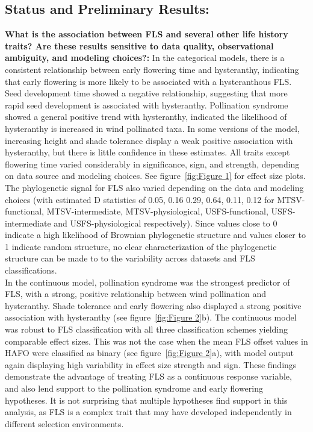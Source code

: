\documentclass[12pt]{article}\usepackage[]{graphicx}\usepackage[]{color}
\begin{document}
\subsection*{Status and Preliminary Results:}
\indent\indent\textbf{What is the association between FLS and several other life history traits?  Are these results sensitive to data quality, observational ambiguity, and modeling choices?:} In the categorical models, there is a consistent relationship between early flowering time and hysteranthy, indicating that early flowering is more likely to be associated with a hysteranthous FLS. Seed development time showed a negative relationship, suggesting that more rapid seed development is associated with hysteranthy. Pollination syndrome showed a general positive trend with hysteranthy, indicated the likelihood of hysteranthy is increased in wind pollinated taxa. In some versions of the model, increasing height and shade tolerance display a weak positive association with hysteranthy, but there is little confidence in these estimates. All traits except flowering time varied considerably in significance, sign, and strength, depending on data source and modeling choices. See figure~\ref{fig:Figure 1} for effect size plots.\\
\indent The phylogenetic signal for FLS also varied depending on the data and modeling choices (with estimated D statistics of 0.05, 0.16 0.29, 0.64, 0.11, 0.12 for MTSV-functional, MTSV-intermediate, MTSV-physiological, USFS-functional, USFS-intermediate and USFS-physiological respectively). Since values close to 0 indicate a high likelihood of Brownian phylogenetic structure and values closer to 1 indicate random structure, no clear characterization of the phylogenetic structure can be made to to the variability across datasets and FLS classifications. \\
\indent In the continuous model, pollination syndrome was the strongest predictor of FLS, with a strong, positive relationship between wind pollination and hysteranthy. Shade tolerance and early flowering also displayed a strong positive association with hysteranthy (see figure~\ref{fig:Figure 2}b). The continuous model was robust to FLS classification with all three classification schemes yielding comparable effect sizes. This was not the case when the mean FLS offset values in HAFO were classified as binary (see figure~\ref{fig:Figure 2}a), with model output again displaying high variability in effect size strength and sign. These findings demonstrate the advantage of treating FLS as a continuous response variable, and also lend support to the pollination syndrome and early flowering hypotheses. It is not surprising that multiple hypotheses find support in this analysis, as FLS is a complex trait that may have developed independently in different selection environments.
\end{document}
